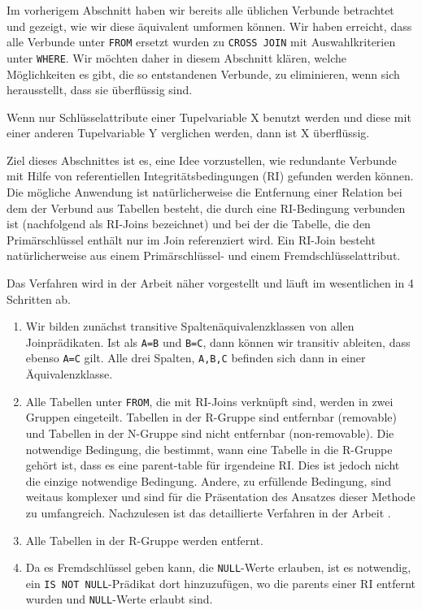 Im vorherigem Abschnitt haben wir bereits alle üblichen Verbunde betrachtet und gezeigt, wie wir diese äquivalent umformen können. Wir haben erreicht, dass alle Verbunde unter \verb|FROM| ersetzt wurden zu \verb|CROSS JOIN| mit Auswahlkriterien unter \verb|WHERE|. Wir möchten daher in diesem Abschnitt klären, welche Möglichkeiten es gibt, die so entstandenen Verbunde, zu eliminieren, wenn sich herausstellt, dass sie überflüssig sind.

Wenn nur Schlüsselattribute einer Tupelvariable X benutzt werden und diese mit  einer anderen Tupelvariable Y verglichen werden, dann ist X überflüssig.

Ziel dieses Abschnittes ist es, eine Idee vorzustellen, wie redundante Verbunde mit Hilfe von referentiellen Integritätsbedingungen (RI) gefunden werden können. 
Die mögliche Anwendung ist natürlicherweise die Entfernung einer Relation bei dem der Verbund aus Tabellen besteht, die durch eine RI-Bedingung verbunden ist (nachfolgend als RI-Joins bezeichnet) und bei der die Tabelle, die den Primärschlüssel enthält nur im Join referenziert wird. Ein RI-Join besteht natürlicherweise aus einem Primärschlüssel- und einem Fremdschlüsselattribut.

Das Verfahren wird in der Arbeit \cite{joinelem2} näher vorgestellt und läuft im wesentlichen in 4 Schritten ab.

\begin{enumerate}
\item Wir bilden zunächst transitive Spaltenäquivalenzklassen von allen Joinprädikaten. Ist als \verb|A=B| und \verb|B=C|, dann können wir transitiv ableiten, dass ebenso \verb|A=C| gilt. Alle drei Spalten, \verb|A,B,C| befinden sich dann in einer Äquivalenzklasse.

\item Alle Tabellen unter \verb|FROM|, die mit RI-Joins verknüpft sind, werden in zwei Gruppen eingeteilt. Tabellen in der R-Gruppe sind entfernbar (removable) und Tabellen in der N-Gruppe sind nicht entfernbar (non-removable). Die notwendige Bedingung, die bestimmt, wann eine Tabelle in die R-Gruppe gehört ist, dass es eine parent-table für irgendeine RI. Dies ist jedoch nicht die einzige notwendige Bedingung. Andere, zu erfüllende Bedingung, sind weitaus komplexer und sind für die Präsentation des Ansatzes dieser Methode zu umfangreich. Nachzulesen ist das detaillierte Verfahren in der Arbeit \cite{joinelem2}.

\item Alle Tabellen in der R-Gruppe werden entfernt.

\item Da es Fremdschlüssel geben kann, die \verb|NULL|-Werte erlauben, ist es notwendig, ein \verb|IS NOT NULL|-Prädikat dort hinzuzufügen, wo die parents einer RI entfernt wurden und \verb|NULL|-Werte erlaubt sind.
\end{enumerate}

